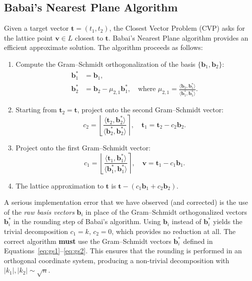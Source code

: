 \documentclass[11pt,a4paper]{article}
\theoremstyle{definition}
\begin{document}
\subsection{Babai's Nearest Plane Algorithm}

Given a target vector $\mathbf{t} = (t_1, t_2)$, the Closest Vector Problem (CVP) asks for the lattice point $\mathbf{v} \in L$ closest to $\mathbf{t}$. Babai's Nearest Plane algorithm provides an efficient approximate solution. The algorithm proceeds as follows:

\begin{enumerate}
  \item Compute the Gram--Schmidt orthogonalization of the basis $\{\mathbf{b}_1, \mathbf{b}_2\}$:
  \begin{align}
    \mathbf{b}_1^* &= \mathbf{b}_1, \label{eq:gs1} \\
    \mathbf{b}_2^* &= \mathbf{b}_2 - \mu_{2,1} \mathbf{b}_1^*, \quad \text{where } \mu_{2,1} = \frac{\langle \mathbf{b}_2, \mathbf{b}_1^* \rangle}{\langle \mathbf{b}_1^*, \mathbf{b}_1^* \rangle}. \label{eq:gs2}
  \end{align}
  \item Starting from $\mathbf{t}_2 = \mathbf{t}$, project onto the second Gram--Schmidt vector:
  \begin{equation}
    c_2 = \left\lfloor \frac{\langle \mathbf{t}_2, \mathbf{b}_2^* \rangle}{\langle \mathbf{b}_2^*, \mathbf{b}_2^* \rangle} \right\rceil, \quad \mathbf{t}_1 = \mathbf{t}_2 - c_2 \mathbf{b}_2.
  \end{equation}
  \item Project onto the first Gram--Schmidt vector:
  \begin{equation}
    c_1 = \left\lfloor \frac{\langle \mathbf{t}_1, \mathbf{b}_1^* \rangle}{\langle \mathbf{b}_1^*, \mathbf{b}_1^* \rangle} \right\rceil, \quad \mathbf{v} = \mathbf{t}_1 - c_1 \mathbf{b}_1.
  \end{equation}
  \item The lattice approximation to $\mathbf{t}$ is $\mathbf{t} - (c_1 \mathbf{b}_1 + c_2 \mathbf{b}_2)$.
\end{enumerate}

\begin{tcolorbox}[colback=red!5,colframe=red!75!black,title={Critical Fix: Gram--Schmidt vs.\ Raw Basis}]
  A serious implementation error that we have observed (and corrected) is the use of the \emph{raw basis vectors} $\mathbf{b}_i$ in place of the Gram--Schmidt orthogonalized vectors $\mathbf{b}_i^*$ in the rounding step of Babai's algorithm. Using $\mathbf{b}_i$ instead of $\mathbf{b}_i^*$ yields the trivial decomposition $c_1 = k$, $c_2 = 0$, which provides no reduction at all. The correct algorithm \textbf{must} use the Gram--Schmidt vectors $\mathbf{b}_i^*$ defined in Equations~\ref{eq:gs1}--\ref{eq:gs2}. This ensures that the rounding is performed in an orthogonal coordinate system, producing a non-trivial decomposition with $|k_1|, |k_2| \sim \sqrt{n}$.
\end{tcolorbox}
\end{document}
